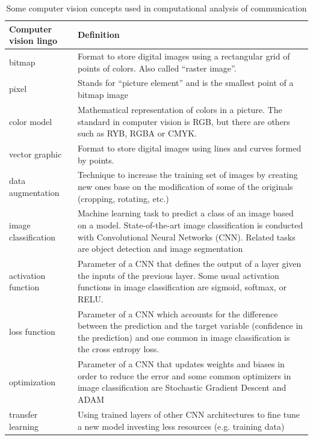 \begin{table}
\caption{Some computer vision concepts used in computational analysis of communication \label{tab:visionlingo}}{
  \centering
\begin{tabularx}{\textwidth}{XX}
\toprule
Computer vision lingo  & Definition \\ \midrule
bitmap         & Format to store digital images using a rectangular grid of points of colors. Also called ``raster image''.\\
pixel                 & Stands for ``picture element'' and is the smallest point of a bitmap image  \\
color model                   & Mathematical representation of colors in a picture. The standard in computer vision is RGB, but there are others such as RYB, RGBA or CMYK.  \\
vector graphic        & Format to store digital images using lines and curves formed by points. \\
data augmentation            & Technique to increase the training set of images by creating new ones base on the modification of some of the originals (cropping, rotating, etc.) \\
image classification  & Machine learning task to predict a class of an image based on a model. State-of-the-art image classification is conducted with Convolutional Neural Networks (CNN). Related tasks are object detection and image segmentation \\
activation function            & Parameter of a CNN that defines the output of a layer given the inputs of the previous layer. Some usual activation functions in image classification are sigmoid, softmax, or RELU. \\
loss function           & Parameter of a CNN which accounts for the difference between the prediction and the target variable (confidence in the prediction) and one common in image classification is the cross entropy loss. \\
optimization           & Parameter of a CNN that updates weights and biases in order to reduce the error and some common optimizers in image classification are Stochastic Gradient Descent and ADAM \\
transfer learning             & Using trained layers of other CNN architectures to fine tune a new model investing less resources (e.g. training data) \\
\bottomrule
\end{tabularx}}{}
\end{table}


